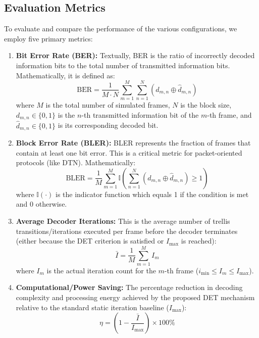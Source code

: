\documentclass[journal,twocolumn]{IEEEtran}
\begin{document}
\subsection{Evaluation Metrics}
To evaluate and compare the performance of the various configurations, we employ five primary metrics:
\begin{enumerate}
  \item \textbf{Bit Error Rate (BER):} Textually, BER is the ratio of incorrectly decoded information bits to the total number of transmitted information bits. Mathematically, it is defined as:
  \begin{equation}
    \text{BER} = \frac{1}{M \cdot N} \sum_{m=1}^{M} \sum_{n=1}^{N} (d_{m,n} \oplus \hat{d}_{m,n})
  \end{equation}
  where $M$ is the total number of simulated frames, $N$ is the block size, $d_{m,n} \in \{0, 1\}$ is the $n$-th transmitted information bit of the $m$-th frame, and $\hat{d}_{m,n} \in \{0, 1\}$ is its corresponding decoded bit.

  \item \textbf{Block Error Rate (BLER):} BLER represents the fraction of frames that contain at least one bit error. This is a critical metric for packet-oriented protocols (like DTN). Mathematically:
  \begin{equation}
    \text{BLER} = \frac{1}{M} \sum_{m=1}^{M} \mathbb{I}\left( \sum_{n=1}^{N} (d_{m,n} \oplus \hat{d}_{m,n}) \geq 1 \right)
  \end{equation}
  where $\mathbb{I}(\cdot)$ is the indicator function which equals 1 if the condition is met and 0 otherwise.

  \item \textbf{Average Decoder Iterations:} This is the average number of trellis transitions/iterations executed per frame before the decoder terminates (either because the DET criterion is satisfied or $I_{\max}$ is reached):
  \begin{equation}
    \bar{I} = \frac{1}{M} \sum_{m=1}^{M} I_m
  \end{equation}
  where $I_m$ is the actual iteration count for the $m$-th frame ($i_{\min} \leq I_m \leq I_{\max}$).

  \item \textbf{Computational/Power Saving:} The percentage reduction in decoding complexity and processing energy achieved by the proposed DET mechanism relative to the standard static iteration baseline ($I_{\max}$):
  \begin{equation}
    \eta = \left( 1 - \frac{\bar{I}}{I_{\max}} \right) \times 100\%
  \end{equation}


\end{enumerate}
\end{document}
